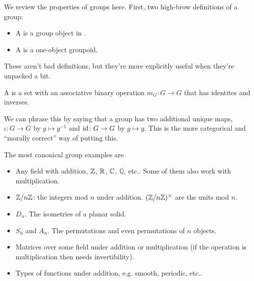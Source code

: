 \documentclass[11pt]{article}
\begin{document}
We review the properties of groups here. First,
two high-brow definitions of a group:
\begin{itemize}
    \item A  is a group object in .
    \item A  is a one-object groupoid.
\end{itemize}
These aren't bad definitions, but they're more explicitly
useful when they're unpacked a bit.
\begin{definition}
    A  is a set with an associative binary operation
    $m_G \colon G \to G$ that has identites and inverses.
\end{definition}
We can phrase this by saying that a group has two additional unique maps,
$\iota \colon G \to G$ by $g \mapsto g^{-1}$ and $\operatorname{id} \colon G \to G$
by $g \mapsto g$. This is the more categorical and ``morally correct''
way of putting this.
\begin{eexample}
    The most canonical group examples are
    \begin{itemize}
        \item Any field with addition, $\mathbb{Z}$, $\mathbb{R}$, $\mathbb{C}$, $\mathbb{Q}$,
        etc.. Some of them also work with multiplication.
        \item $\mathbb{Z}/n\mathbb{Z}$: the integers mod $n$ under addition. $(\mathbb{Z}/n\mathbb{Z})^\times$
        are the units mod $n$.
        \item $D_n$. The isometries of a planar solid.
        \item $S_n$ and $A_n$. The permutations and even permutations of $n$ objects.
        \item Matrices over some field under addition or multiplication (if the operation
        is multiplication then needs invertibility).
        \item Types of functions under addition, e.g. smooth, periodic, etc..
    \end{itemize}
\end{eexample}
\end{document}
